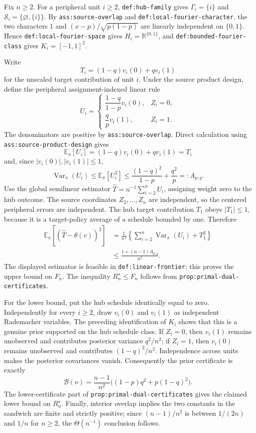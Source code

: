 Fix \(n\ge2\).  For a peripheral unit \(i\ge2\), \texttt{def:hub-family} gives \(\Gamma_i=\{i\}\) and \(\mathcal S_i=\{\varnothing,\{i\}\}\).  By \texttt{ass:source-overlap} and \texttt{def:local-fourier-character}, the two characters \(1\) and \((x-p)/\sqrt{p(1-p)}\) are linearly independent on \(\{0,1\}\).  Hence \texttt{def:local-fourier-space} gives \(H_i=\mathbb R^{\{0,1\}}\), and \texttt{def:bounded-fourier-class} gives \(K_i=[-1,1]^2\).

Write
\[
 T_i=(1-q)v_i(0)+qv_i(1)
\]
for the unscaled target contribution of unit \(i\).  Under the source product design, define the peripheral assignment-indexed linear rule
\[
 U_i=
 \begin{cases}
 \dfrac{1-q}{1-p}v_i(0),&Z_i=0,\\[5pt]
 \dfrac{q}{p}v_i(1),&Z_i=1.
 \end{cases}
\]
The denominators are positive by \texttt{ass:source-overlap}.  Direct calculation using \texttt{ass:source-product-design} gives
\[
 \mathbb E_{\pi}[U_i]=(1-q)v_i(0)+qv_i(1)=T_i
\]
and, since \(|v_i(0)|,|v_i(1)|\le1\),
\[
 \operatorname{Var}_{\pi}(U_i)
 \le \mathbb E_{\pi}[U_i^2]
 \le \frac{(1-q)^2}{1-p}+\frac{q^2}{p}=:A_{p,q}.
\]
Use the global semilinear estimator \(\widehat T=n^{-1}\sum_{i=2}^nU_i\), assigning weight zero to the hub outcome.  The source coordinates \(Z_2,\ldots,Z_n\) are independent, so the centered peripheral errors are independent.  The hub target contribution \(T_1\) obeys \(|T_1|\le1\), because it is a target-policy average of a schedule bounded by one.  Therefore
\[
\begin{aligned}
 \mathbb E_{\pi}[(\widehat T-\theta(v))^2]
 &=\frac1{n^2}\left\{
 \sum_{i=2}^n\operatorname{Var}_{\pi}(U_i)+T_1^2\right\}\\
 &\le \frac{1+(n-1)A_{p,q}}{n^2}.
\end{aligned}
\]
The displayed estimator is feasible in \texttt{def:linear-frontier}; this proves the upper bound on \(F_n\).  The inequality \(R_n^{\star}\le F_n\) follows from \texttt{prop:primal-dual-certificates}.

For the lower bound, put the hub schedule identically equal to zero.  Independently for every \(i\ge2\), draw \(v_i(0)\) and \(v_i(1)\) as independent Rademacher variables.  The preceding identification of \(K_i\) shows that this is a genuine prior supported on the hub schedule class.  If \(Z_i=0\), then \(v_i(1)\) remains unobserved and contributes posterior variance \(q^2/n^2\); if \(Z_i=1\), then \(v_i(0)\) remains unobserved and contributes \((1-q)^2/n^2\).  Independence across units makes the posterior covariances vanish.  Consequently the prior certificate is exactly
\[
 \mathcal B(\nu)
 =\frac{n-1}{n^2}\bigl((1-p)q^2+p(1-q)^2\bigr).
\]
The lower-certificate part of \texttt{prop:primal-dual-certificates} gives the claimed lower bound on \(R_n^{\star}\).  Finally, interior overlap implies the two constants in the sandwich are finite and strictly positive; since \((n-1)/n^2\) is between \(1/(2n)\) and \(1/n\) for \(n\ge2\), the \(\Theta(n^{-1})\) conclusion follows.